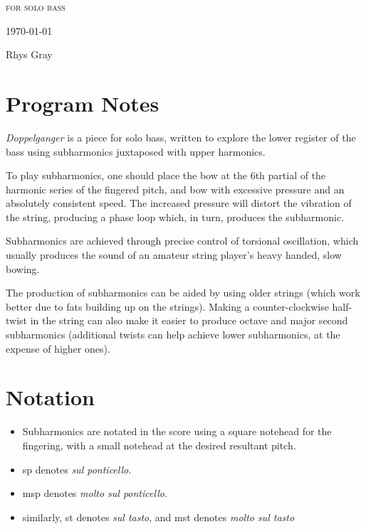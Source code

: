 
\invisiblechapter{\bassPiece}

\vspace{3.8cm}

\begin{center}

\textsc{for solo bass}

\vspace{2.8cm}

\HRule{0.5pt}

\LARGE \textbf{\uppercase{\bassPiece}}

\HRule{2pt}

\vspace{1.8cm}

\normalsize \today

\vspace{3.8cm}

Rhys Gray

\end{center}
\newpage

\section*{Program Notes}
\emph{Doppelganger} is a piece for solo bass, written to explore the lower register of the bass using subharmonics juxtaposed with upper harmonics. 

To play subharmonics, one should place the bow at the 6th partial of the harmonic series of the fingered pitch, and bow with excessive pressure and an absolutely consistent speed. 
The increased pressure will distort the vibration of the string, producing a phase loop which, in turn, produces the subharmonic. 

Subharmonics are achieved through precise control of torsional oscillation, which usually produces the sound of an amateur string player's heavy handed, slow bowing. 

The production of subharmonics can be aided by using older strings (which work better due to fats building up on the strings). 
Making a counter-clockwise half-twist in the string can also make it easier to produce octave and major second subharmonics (additional twists can help achieve lower subharmonics, at the expense of higher ones).

\section*{Notation}
\begin{itemize}

    \item Subharmonics are notated in the score using a square notehead for the fingering, with a small notehead at the desired resultant pitch.
    \item sp denotes \emph{sul ponticello}.
    \item msp denotes \emph{molto sul ponticello}.
    \item similarly, st denotes \emph{sul tasto}, and mst denotes \emph{molto sul tasto}
\end{itemize}

\newpage

% 
\label{app:The Veldt Score}
